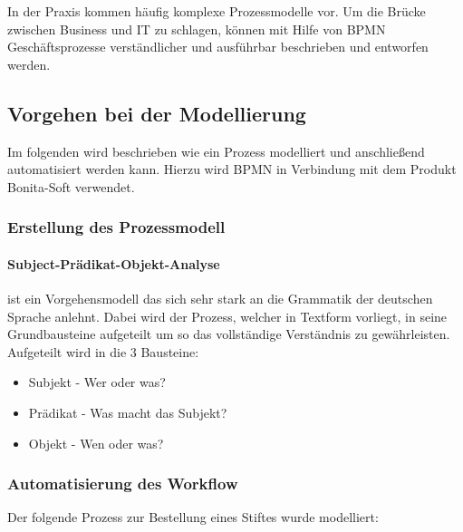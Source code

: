 In der Praxis kommen häufig komplexe Prozessmodelle vor.
Um die Brücke zwischen Business und IT zu schlagen,
können mit Hilfe von BPMN Geschäftsprozesse verständlicher und ausführbar
beschrieben und entworfen werden.\\



\subsection{Vorgehen bei der Modellierung}
Im folgenden wird beschrieben wie ein Prozess modelliert und anschließend
automatisiert werden kann. Hierzu wird BPMN in Verbindung mit dem Produkt
Bonita-Soft verwendet.

\subsubsection{Erstellung des Prozessmodell}

\paragraph{Subject-Prädikat-Objekt-Analyse} ist ein Vorgehensmodell das sich
sehr stark an die Grammatik der deutschen Sprache anlehnt. Dabei wird der
Prozess, welcher in Textform vorliegt, in seine Grundbausteine aufgeteilt um so
das vollständige Verständnis zu gewährleisten. Aufgeteilt wird in die 3
Bausteine:

\begin{itemize}
\item Subjekt - Wer oder was?
\item Prädikat - Was macht das Subjekt?
\item Objekt - Wen oder was?
\end{itemize}



\subsubsection{Automatisierung des Workflow}

Der folgende Prozess zur Bestellung eines Stiftes wurde modelliert:


